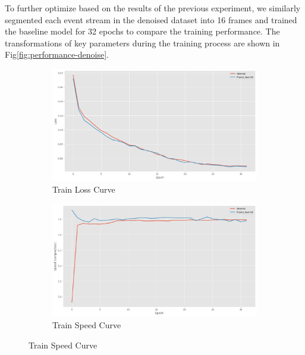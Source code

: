 \documentclass[conference]{IEEEtran}
\begin{document}
To further optimize based on the results of the previous experiment, we similarly segmented each event stream in the denoised dataset into 16 frames and trained the baseline model for 32 epochs to compare the training performance. The transformations of key parameters during the training process are shown in Fig\ref{fig:performance-denoise}.
\begin{figure}[htbp]
    \centering
    \begin{subfigure}[b]{0.24\textwidth}
        \centering
        \includegraphics[width=\textwidth]{figure/denoise_train_loss.png}
        \caption{Train Loss Curve}
        \label{fig:sub1-d}
    \end{subfigure}
    \begin{subfigure}[b]{0.24\textwidth}
        \centering
        \includegraphics[width=\textwidth]{figure/denoise_train_speed.png}
        \caption{Train Speed Curve}
        \label{fig:sub2-d}
    \end{subfigure}

    \vspace{0.01em} %


\end{figure}
\end{document}
